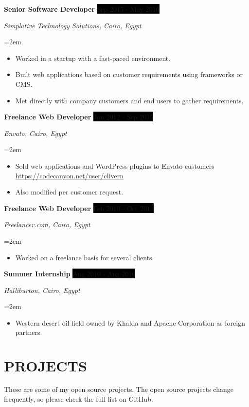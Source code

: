 \documentclass[paper=a4,fontsize=11pt]{scrartcl} %
\newcommand{\sepspace}{\vspace*{1em}}		%
\newcommand{\NewPart}[1]{\section*{\uppercase{#1}}}
\newcommand{\EducationEntry}[4]{
		\noindent \textbf{#1} \hfill      %
		\colorbox{Black}{%
			\parbox{6em}{%
			\hfill\color{White}#2}} \par  %
		\noindent \textit{#3} \par        %
		\noindent\hangindent=2em\hangafter=0 \small #4 %
		\normalsize \par}
\newcommand{\WorkEntry}[4]{				  %
		\noindent \textbf{#1} \hfill      %
		\colorbox{Black}{\color{White}#2} \par  %
		\noindent \textit{#3} \par              %
		\noindent\hangindent=2em\hangafter=0 \small #4 %
		\normalsize \par}
\begin{document}
\WorkEntry{Senior Software Developer}{Sep 2015 - May 2016}{Simplative Technology Solutions, Cairo, Egypt}{\begin{itemize}
\item Worked in a startup with a fast-paced environment.
\item Built web applications based on customer requirements using frameworks or CMS.
\item Met directly with company customers and end users to gather requirements.
\end{itemize}}
\sepspace

\WorkEntry{Freelance Web Developer}{Jan 2012 - Sep 2015}{Envato, Cairo, Egypt}{\begin{itemize}
\item Sold web applications and WordPress plugins to Envato customers \url{https://codecanyon.net/user/clivern}
\item Also modified per customer request.
\end{itemize}}
\sepspace

\WorkEntry{Freelance Web Developer}{Feb 2010 - Oct 2011}{Freelancer.com, Cairo, Egypt}{\begin{itemize}
\item Worked on a freelance basis for several clients.
\end{itemize}}
\sepspace

\WorkEntry{Summer Internship}{Aug 2010 - Aug 2010}{Halliburton, Cairo, Egypt}{\begin{itemize}
\item Western desert oil field owned by Khalda and Apache Corporation as foreign partners.
\end{itemize}}


\NewPart{Projects}{}

These are some of my open source projects. The open source projects change frequently, so please check the full list on GitHub.
\end{document}
